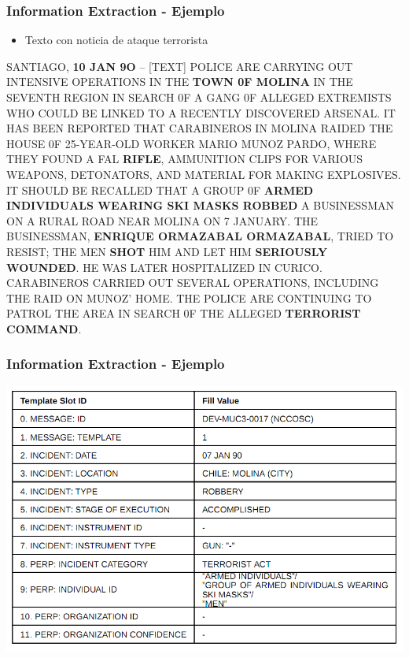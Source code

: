 \documentclass[xcolor=dvipsnames]{beamer}
\begin{document}
\begin{frame}
\frametitle{Information Extraction - Ejemplo}
\begin{itemize}
 \item Texto con noticia de ataque terrorista
\end{itemize}
\tiny{SANTIAGO, \textbf{10 JAN 9O} -- [TEXT] POLICE ARE CARRYING OUT INTENSIVE
OPERATIONS IN THE \textbf{TOWN 0F MOLINA} IN THE SEVENTH REGION IN SEARCH 0F A
GANG 0F ALLEGED EXTREMISTS WHO COULD BE LINKED TO A RECENTLY
DISCOVERED ARSENAL. IT HAS BEEN REPORTED THAT CARABINEROS IN MOLINA
RAIDED THE HOUSE 0F 25-YEAR-OLD WORKER MARIO MUNOZ PARDO, WHERE THEY
FOUND A FAL \textbf{RIFLE}, AMMUNITION CLIPS FOR VARIOUS WEAPONS, DETONATORS,
AND MATERIAL FOR MAKING EXPLOSIVES. IT SHOULD BE RECALLED THAT A
GROUP 0F \textbf{ARMED INDIVIDUALS WEARING SKI MASKS ROBBED} A BUSINESSMAN ON
A RURAL ROAD NEAR MOLINA ON 7 JANUARY. THE BUSINESSMAN, \textbf{ENRIQUE
ORMAZABAL ORMAZABAL}, TRIED TO RESIST; THE MEN \textbf{SHOT} HIM AND LET HIM
\textbf{SERIOUSLY WOUNDED}. HE WAS LATER HOSPITALIZED IN CURICO. CARABINEROS
CARRIED OUT SEVERAL OPERATIONS, INCLUDING THE RAID ON MUNOZ’ HOME.
THE POLICE ARE CONTINUING TO PATROL THE AREA IN SEARCH 0F THE ALLEGED
\textbf{TERRORIST COMMAND}.}
\end{frame}

\begin{frame}
\frametitle{Information Extraction - Ejemplo}
\begin{center}
 \includegraphics[scale=0.3]{template1.png}
\end{center}
\end{frame}
\end{document}
